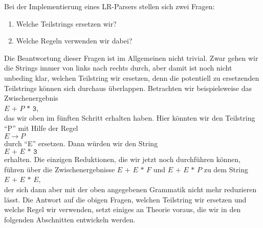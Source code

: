\noindent
Bei der Implementierung eines LR-Parsers stellen sich zwei Fragen:
\begin{enumerate}
\item Welche Teilstrings ersetzen wir?
\item Welche Regeln verwenden wir dabei?
\end{enumerate}
Die Beantwortung dieser Fragen ist im Allgemeinen nicht trivial.  Zwar gehen wir die Strings immer
von links nach rechts durch, aber damit ist noch nicht unbeding klar, welchen Teilstring wir
ersetzen, denn die potentiell zu ersetzenden Teilstrings k\"onnen sich durchaus \"uberlappen.
Betrachten wir beispielsweise das Zwischenergebnis
\\[0.2cm]
\hspace*{1.3cm}
$E \texttt{ + } P \texttt{ * 3}$,
\\[0.2cm]
das wir oben im f\"unften Schritt erhalten haben.
Hier k\"onnten wir den Teilstring ``P'' mit Hilfe der Regel
\\[0.2cm]
\hspace*{1.3cm}
$E \rightarrow P$
\\[0.2cm]
durch ``E'' ersetzen.  Dann w\"urden wir den String
\\[0.2cm]
\hspace*{1.3cm}
$E \texttt{ + } E \texttt{ * 3}$
\\[0.2cm]
erhalten.  Die einzigen Reduktionen, die wir jetzt noch durchf\"uhren k\"onnen, f\"uhren \"uber die
Zwischenergebnisse $E \texttt{ + } E \texttt{ * }  F$ und $E \texttt{ + } E \texttt{ * } P$
zu dem String
\\[0.2cm]
\hspace*{1.3cm}
$E \texttt{ + } E \texttt{ * }  E$,
\\[0.2cm]
der sich dann  aber mit der oben angegebenen Grammatik nicht mehr reduzieren l\"asst.  
Die Antwort auf die obigen Fragen, welchen Teilstring wir ersetzen und welche Regel wir
verwenden, setzt einiges an Theorie voraus, die wir
in den folgenden Abschnitten entwickeln werden.


